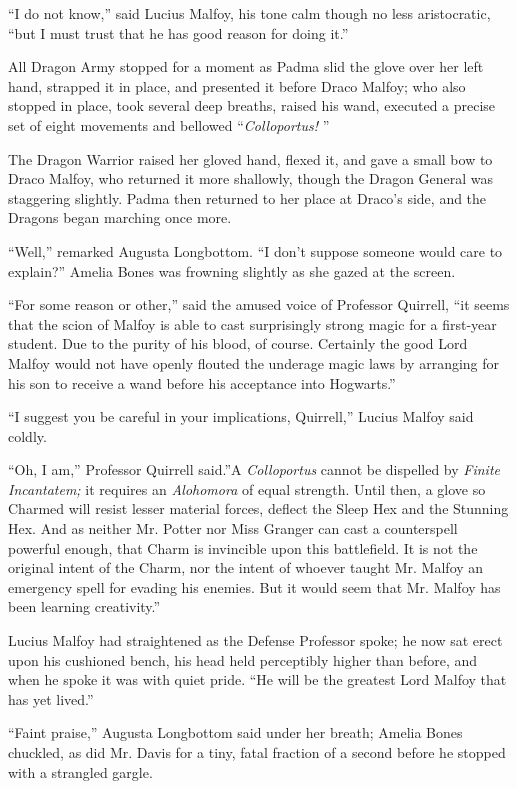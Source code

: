 ``I do not know,'' said Lucius Malfoy, his tone calm though no less
aristocratic, ``but I must trust that he has good reason for doing it.''

All Dragon Army stopped for a moment as Padma slid the glove over her
left hand, strapped it in place, and presented it before Draco Malfoy;
who also stopped in place, took several deep breaths, raised his wand,
executed a precise set of eight movements and bellowed
``\emph{Colloportus!} ''

The Dragon Warrior raised her gloved hand, flexed it, and gave a small
bow to Draco Malfoy, who returned it more shallowly, though the Dragon
General was staggering slightly. Padma then returned to her place at
Draco's side, and the Dragons began marching once more.

``Well,'' remarked Augusta Longbottom. ``I don't suppose someone would
care to explain?'' Amelia Bones was frowning slightly as she gazed at
the screen.

``For some reason or other,'' said the amused voice of Professor
Quirrell, ``it seems that the scion of Malfoy is able to cast
surprisingly strong magic for a first-year student. Due to the purity of
his blood, of course. Certainly the good Lord Malfoy would not have
openly flouted the underage magic laws by arranging for his son to
receive a wand before his acceptance into Hogwarts.''

``I suggest you be careful in your implications, Quirrell,'' Lucius
Malfoy said coldly.

``Oh, I am,'' Professor Quirrell said.''A \emph{Colloportus} cannot be
dispelled by \emph{Finite Incantatem;} it requires an \emph{Alohomora}
of equal strength. Until then, a glove so Charmed will resist lesser
material forces, deflect the Sleep Hex and the Stunning Hex. And as
neither Mr. Potter nor Miss Granger can cast a counterspell powerful
enough, that Charm is invincible upon this battlefield. It is not the
original intent of the Charm, nor the intent of whoever taught Mr.
Malfoy an emergency spell for evading his enemies. But it would seem
that Mr. Malfoy has been learning creativity.''

Lucius Malfoy had straightened as the Defense Professor spoke; he now
sat erect upon his cushioned bench, his head held perceptibly higher
than before, and when he spoke it was with quiet pride. ``He will be the
greatest Lord Malfoy that has yet lived.''

``Faint praise,'' Augusta Longbottom said under her breath; Amelia Bones
chuckled, as did Mr. Davis for a tiny, fatal fraction of a second before
he stopped with a strangled gargle.

